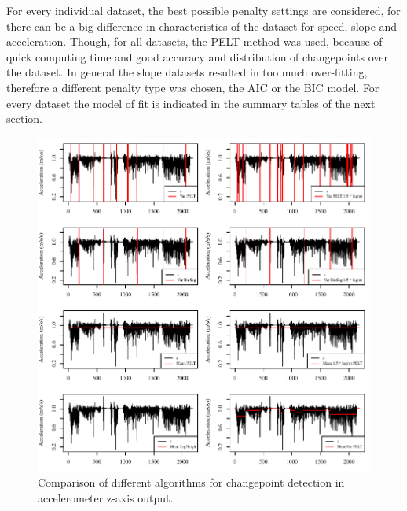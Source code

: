For every individual dataset, the best possible penalty settings are considered, for there can be a big difference in characteristics of the dataset for speed, slope and acceleration. Though, for all datasets, the PELT method was used, because of quick computing time and good accuracy and distribution of changepoints over the dataset. In general the slope datasets resulted in too much over-fitting, therefore a different penalty type was chosen, the AIC or the BIC model. For every dataset the model of fit is indicated in the summary tables of the next section. 






\begin{figure}[ht]
\includegraphics[width=\textwidth]{img/R_comparisonMethodsZ.pdf}
\centering
\caption{Comparison of different algorithms for changepoint detection in accelerometer z-axis output.\label{cpcomp}}
\end{figure} 

